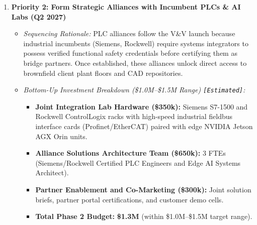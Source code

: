 \documentclass[11pt,a4paper]{article}
\begin{document}
\begin{enumerate}
    \item \textbf{Priority 2: Form Strategic Alliances with Incumbent PLCs \& AI Labs (Q2 2027)}
    \begin{itemize}
        \item \textit{Sequencing Rationale:} PLC alliances follow the V\&V launch because industrial incumbents (Siemens, Rockwell) require systems integrators to possess verified functional safety credentials before certifying them as bridge partners. Once established, these alliances unlock direct access to brownfield client plant floors and CAD repositories.
        \item \textit{Bottom-Up Investment Breakdown (\$1.0M--\$1.5M Range) \texttt{[Estimated]}:}
        \begin{itemize}
            \item \textbf{Joint Integration Lab Hardware (\$350k):} Siemens S7-1500 and Rockwell ControlLogix racks with high-speed industrial fieldbus interface cards (Profinet/EtherCAT) paired with edge NVIDIA Jetson AGX Orin units.
            \item \textbf{Alliance Solutions Architecture Team (\$650k):} 3 FTEs (Siemens/Rockwell Certified PLC Engineers and Edge AI Systems Architect).
            \item \textbf{Partner Enablement and Co-Marketing (\$300k):} Joint solution briefs, partner portal certifications, and customer demo cells.
            \item \textbf{Total Phase 2 Budget:} \textbf{\$1.3M} (within \$1.0M--\$1.5M target range).
        \end{itemize}
    \end{itemize}


\end{enumerate}
\end{document}
